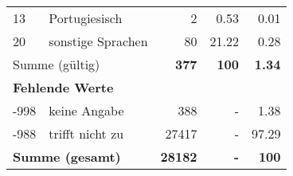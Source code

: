 \begin{longtable}{lXrrr}
     13 &
     \multicolumn{1}{X}{ Portugiesisch   } &


       \num{2} &
       \num[round-mode=places,round-precision=2]{0.53} &
         \num[round-mode=places,round-precision=2]{0.01} \\

     20 &
     \multicolumn{1}{X}{ sonstige Sprachen   } &


       \num{80} &
       \num[round-mode=places,round-precision=2]{21.22} &
         \num[round-mode=places,round-precision=2]{0.28} \\
     \midrule
     \multicolumn{2}{l}{Summe (gültig)} &
       \textbf{\num{377}} &
     \textbf{\num{100}} &
       \textbf{\num[round-mode=places,round-precision=2]{1.34}} \\
     \multicolumn{5}{l}{\textbf{Fehlende Werte}}\\
       -998 &
       keine Angabe &
         \num{388} &
        - &
         \num[round-mode=places,round-precision=2]{1.38} \\
       -988 &
       trifft nicht zu &
         \num{27417} &
        - &
         \num[round-mode=places,round-precision=2]{97.29} \\
     \midrule
     \multicolumn{2}{l}{\textbf{Summe (gesamt)}} &
          \textbf{\num{28182}} &
        \textbf{-} &
        \textbf{\num{100}} \\
     \bottomrule
     \end{longtable}
     
